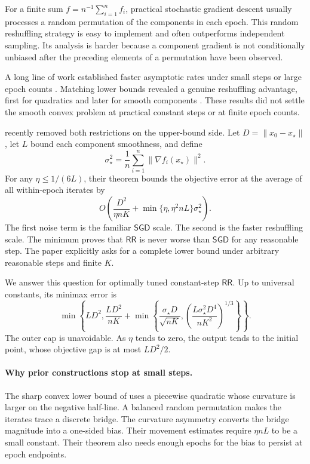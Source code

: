 \documentclass[twoside]{article}
\newcommand{\RR}{\mathsf{RR}}
\newcommand{\SGD}{\mathsf{SGD}}
\begin{document}
For a finite sum $f=n^{-1}\sum_{i=1}^n f_i$, practical stochastic gradient descent usually processes a random permutation of the components in each epoch. This random reshuffling strategy is easy to implement and often outperforms independent sampling. Its analysis is harder because a component gradient is not conditionally unbiased after the preceding elements of a permutation have been observed.

A long line of work established faster asymptotic rates under small steps or large epoch counts \citep{nagaraj2019sgd,haochen2019random, mishchenko2020random,ahn2020sgd,nguyen2021unified}. Matching lower bounds revealed a genuine reshuffling advantage, first for quadratics and later for smooth components \citep{safran2020good,rajput2020closing,safran2021many,cha2023tighter}. These results did not settle the smooth convex problem at practical constant steps or at finite epoch counts.

\citet{liu2026dominates} recently removed both restrictions on the upper-bound side. Let $D=\lVert x_0-x_\star\rVert$, let $L$ bound each component smoothness, and define
\begin{equation}
 \sigma_\star^2=\frac1n\sum_{i=1}^n
 \lVert\nabla f_i(x_\star)\rVert^2.
 \label{eq:sigma}
\end{equation}
For any $\eta\le 1/(6L)$, their theorem bounds the objective error at the average of all within-epoch iterates by
\begin{equation}
 O\!\left(
 \frac{D^2}{\eta nK}
 +\min\{\eta,\eta^2nL\}\sigma_\star^2
 \right).
 \label{eq:liu-fixed}
\end{equation}
The first noise term is the familiar $\SGD$ scale. The second is the faster reshuffling scale. The minimum proves that $\RR$ is never worse than $\SGD$ for any reasonable step. The paper explicitly asks for a complete lower bound under arbitrary reasonable steps and finite $K$.

We answer this question for optimally tuned constant-step $\RR$. Up to universal constants, its minimax error is
\begin{equation}
 \min\!\left\{LD^2,\frac{LD^2}{nK}
 +\min\!\left\{
 \frac{\sigma_\star D}{\sqrt{nK}},
 \left(\frac{L\sigma_\star^2D^4}{nK^2}\right)^{1/3}
 \right\}\right\}.
 \label{eq:rate-intro}
\end{equation}
The outer cap is unavoidable. As $\eta$ tends to zero, the output tends to the initial point, whose objective gap is at most $LD^2/2$.

\paragraph{Why prior constructions stop at small steps.}
The sharp convex lower bound of \citet{cha2023tighter} uses a piecewise quadratic whose curvature is larger on the negative half-line. A balanced random permutation makes the iterates trace a discrete bridge. The curvature asymmetry converts the bridge magnitude into a one-sided bias. Their movement estimates require $\eta nL$ to be a small constant. Their theorem also needs enough epochs for the bias to persist at epoch endpoints.
\end{document}
